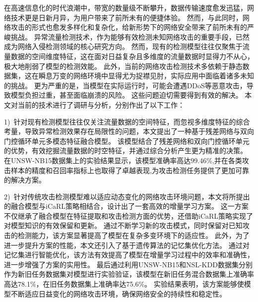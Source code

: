 \begin{cabstract}
在高速信息化的时代浪潮中，带宽的数量级不断攀升，数据传输速度愈发迅猛，网络技术更是日新月异，为用户带来了前所未有的便捷体验。
然而，与此同时，网络攻击的形式也愈发多样化和复杂化，给新形势下的网络安全带来了前所未有的严峻挑战。
异常流量检测技术，作为能够有效检测未知网络攻击的重要手段，已然成为网络入侵检测领域的核心研究方向。
然而，现有的检测模型往往仅聚焦于流量数据的空间维度特征，这在面对日益复杂且多维度的流量数据时显得力不从心，极大地削弱了模型的检测效能。
此外，当前的网络攻击检测技术多依赖于静态数据集，这在瞬息万变的网络环境中显得尤为捉襟见肘，实际应用中面临着诸多未知的挑战。
更为严重的是，当模型在实际运行时，可能会遭遇DDoS等恶意攻击，导致模型负担过重，甚至面临崩溃的风险。
这些问题迫切需要得到有效的解决。
本文对当前的技术进行了调研与分析，分别作出了以下工作：\par

1)~针对现有检测模型往往仅关注流量数据的空间特征，而忽视多维度特征的综合考量，导致异常检测效果存在局限性的问题，本文提出了一种基于残差网络与双向门控循环单元多模态特征融合模型。
该模型结合了残差网络和双向门控循环单元的优势，有效挖掘流量数据的时空特征，并通过综合分析产生更为精准的决策。
在UNSW-NB15数据集上的实验结果显示，该模型准确率高达99.46\%,并在各类攻击样本的精度和召回率指标上也取得了卓越表现,为攻击检测任务提供了更加可靠的解决方案。\par

2)~针对传统攻击检测模型难以适应动态变化的网络攻击环境问题，本文将所提出的融合模型与iCaRL策略相结合，设计出了一套高效的增量学习方案。
这一方案不仅继承了融合模型在特征提取和攻击检测方面的优势，还借助iCaRL策略实现了对模型知识的有效保留和更新。
通过不断学习新的攻击模式，同时保留对已知攻击的检测能力，该方案显著提高了模型在复杂多变环境下的适应性。
此外，为了进一步提升方案的性能，本文还引入了基于遗传算法的记忆集优化方法。
通过对记忆集进行智能优化，该方法有效提高了模型在增量学习过程中的效率和准确性，进一步增强了方案的实用性。
最后通过利用UNSW-NB15和NSL-KDD数据集分别作为新旧任务数据集对模型进行实验验证，该模型在新旧任务混合数据集上准确率高达78.1\%，在旧任务数据集上准确率达75.6\%。
实验结果表明，该方案能够使模型不断适应日益变化的网络攻击环境，确保网络安全的持续性和稳定性。\par


\end{cabstract}
